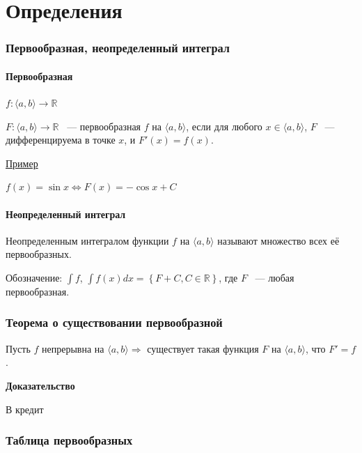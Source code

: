 \documentclass{article}
\begin{document}
\tableofcontents

\newpage

\part{Определения}

	\newpage
	
	\section{Первообразная, неопределенный интеграл}
	
	\subsection{Первообразная}
	
		$f: \langle a, b \rangle \rightarrow \mathbb{R}$
	
		$F: \langle a, b \rangle \rightarrow \mathbb{R}$ ~--- первообразная $f$ на $\langle a, b \rangle$, если для любого $x \in \langle a, b \rangle$, $F$ ~--- дифференцируема в точке $x$, и $F'(x) = f(x)$.
	
		\underline{Пример}
	
		$f(x) = \sin{x} \Leftrightarrow F(x) = -\cos{x} + C$
	
	\subsection{Неопределенный интеграл}
	
		Неопределенным интегралом функции $f$ на $\langle a, b \rangle$ называют множество всех её первообразных.
		
		Обозначение: $\int{f}$, $\int{f(x) dx} = \left\{ F + C, C \in \mathbb{R} \right\}$, где $F$ ~--- любая первообразная.
		
		\newpage
		
		\section{Теорема о существовании первообразной}
		
			Пусть $f$ непрерывна на $\langle a, b \rangle \Rightarrow$ существует такая функция $F$ на $\langle a, b \rangle$, что $F' = f$.
			
			\textbf{Доказательство}
			
			В кредит
			
		\newpage
		
		\section{Таблица первообразных}
		
\end{document}
